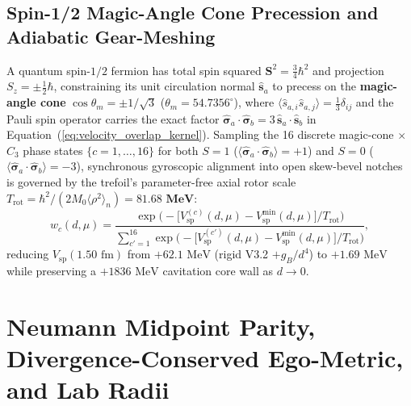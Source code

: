 \documentclass[11pt, a4paper]{article}
\begin{document}
\subsection{Spin-1/2 Magic-Angle Cone Precession and Adiabatic Gear-Meshing}
A quantum spin-$1/2$ fermion has total spin squared $\mathbf{S}^2 = \frac{3}{4}\hbar^2$ and projection $S_z = \pm\frac{1}{2}\hbar$, constraining its unit circulation normal $\hat{\mathbf{s}}_a$ to precess on the \textbf{magic-angle cone} $\cos\theta_m = \pm 1/\sqrt{3}$ ($\theta_m = 54.7356^\circ$), where $\langle \hat{s}_{a,i}\hat{s}_{a,j}\rangle = \frac{1}{3}\delta_{ij}$ and the Pauli spin operator carries the exact factor $\hat{\boldsymbol{\sigma}}_a\cdot\hat{\boldsymbol{\sigma}}_b = 3\,\hat{\mathbf{s}}_a\cdot\hat{\mathbf{s}}_b$ in Equation~(\ref{eq:velocity_overlap_kernel}). Sampling the 16 discrete magic-cone $\times$ $C_3$ phase states $\{c = 1,\dots,16\}$ for both $S = 1$ ($\langle\hat{\boldsymbol{\sigma}}_a\cdot\hat{\boldsymbol{\sigma}}_b\rangle = +1$) and $S = 0$ ($\langle\hat{\boldsymbol{\sigma}}_a\cdot\hat{\boldsymbol{\sigma}}_b\rangle = -3$), synchronous gyroscopic alignment into open skew-bevel notches is governed by the trefoil's parameter-free axial rotor scale $T_{\mathrm{rot}} = \hbar^2/(2 M_0\langle\rho^2\rangle_n) = \mathbf{81.68\text{ MeV}}$:
\begin{equation}
    w_c(d, \mu) = \frac{\exp\!\Big(-\big[V_{\mathrm{sp}}^{(c)}(d,\mu) - V_{\mathrm{sp}}^{\min}(d,\mu)\big] / T_{\mathrm{rot}}\Big)}{\sum_{c'=1}^{16}\exp\!\Big(-\big[V_{\mathrm{sp}}^{(c')}(d,\mu) - V_{\mathrm{sp}}^{\min}(d,\mu)\big] / T_{\mathrm{rot}}\Big)},
    \label{eq:boltzmann_gear_mesh}
\end{equation}
reducing $V_{\mathrm{sp}}(1.50\text{ fm})$ from $+62.1\text{ MeV}$ (rigid V3.2 $+g_B/d^4$) to $+1.69\text{ MeV}$ while preserving a $+1836\text{ MeV}$ cavitation core wall as $d \to 0$.

\section{Neumann Midpoint Parity, Divergence-Conserved Ego-Metric, and Lab Radii}
\label{sec:parity_egometric}
\end{document}
